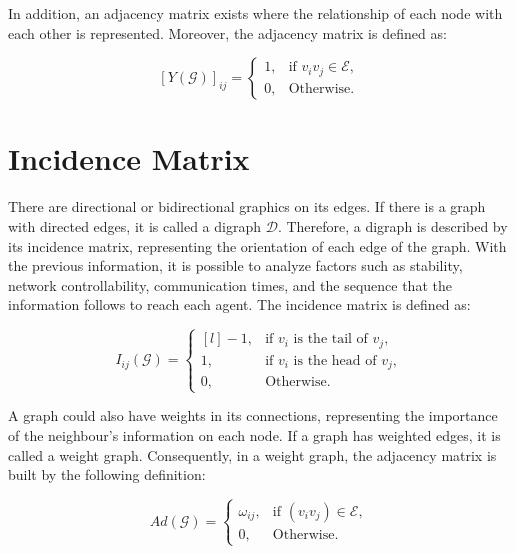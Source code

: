 In addition, an adjacency matrix exists where the relationship of each node with each other is represented. Moreover, the adjacency matrix is defined as:

\begin{equation}
    \left [ Y(\mathcal{G}) \right ]_{ij} = \left\{\begin{matrix}
1, & \text{if } v_{i}v_{j} \in \mathcal{E},\\ 
0, & \text{Otherwise.} 
\end{matrix}\right.
\end{equation}


\section*{Incidence Matrix}
There are directional or bidirectional graphics on its edges. If there is a graph with directed edges, it is called a digraph $\mathcal{D}$. Therefore, a digraph is described by its incidence matrix, representing the orientation of each edge of the graph. With the previous information, it is possible to analyze factors such as stability, network controllability, communication times, and the sequence that the information follows to reach each agent. The incidence matrix is defined as:

\begin{equation}
    I_{ij}(\mathcal{G}) = \left\{\begin{matrix*}[l]
-1, & \text{if } v_{i} \text{ is the tail of } v_{j},\\ 
1, & \text{if } v_{i} \text{ is the head of } v_{j},\\ 
0, &  \text{Otherwise.   }
\end{matrix*}\right.
\end{equation}

A graph could also have weights in its connections, representing the importance of the neighbour's information on each node. If a graph has weighted edges, it is called a weight graph. Consequently, in a weight graph, the adjacency matrix is built by the following definition:


\begin{equation}
    Ad(\mathcal{G}) = \left\{\begin{matrix}
\omega_{ij},   & \text{if } (v_{i}v_{j}) \in \mathcal{E}, \\ 
0, &  \text{Otherwise.}
\end{matrix}\right.
\end{equation}

